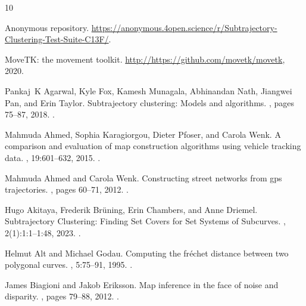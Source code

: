 \documentclass[11pt]{article}
\begin{document}
\begin{thebibliography}{10}

Anonymous repository.
\newblock
  \url{https://anonymous.4open.science/r/Subtrajectory-Clustering-Test-Suite-C13F/}.

{MoveTK: the movement toolkit}.
\newblock \url{http://https://github.com/movetk/movetk}, 2020.

Pankaj~K Agarwal, Kyle Fox, Kamesh Munagala, Abhinandan Nath, Jiangwei Pan, and
  Erin Taylor.
\newblock Subtrajectory clustering: Models and algorithms.
, pages 75--87, 2018.
\newblock \href {https://doi.org/10.1145/3196959.3196972}
  {}.

Mahmuda Ahmed, Sophia Karagiorgou, Dieter Pfoser, and Carola Wenk.
\newblock A comparison and evaluation of map construction algorithms using
  vehicle tracking data.
, 19:601--632, 2015.
\newblock \href {https://doi.org/10.1007/s10707-014-0222-6}
  {}.

Mahmuda Ahmed and Carola Wenk.
\newblock Constructing street networks from gps trajectories.
, pages 60--71, 2012.
\newblock \href {https://doi.org/10.1007/978-3-642-33090-2_7}
  {}.

Hugo Akitaya, Frederik Brüning, Erin Chambers, and Anne Driemel.
\newblock Subtrajectory {Clustering}: {Finding} {Set} {Covers} for {Set}
  {Systems} of {Subcurves}.
, 2(1):1:1--1:48, 2023.
\newblock \href {https://doi.org/10.57717/cgt.v2i1.7}
  {}.

Helmut Alt and Michael Godau.
\newblock Computing the fr{\'e}chet distance between two polygonal curves.
, 5:75--91, 1995.
\newblock \href {https://doi.org/10.1142/S0218195995000064}
  {}.

James Biagioni and Jakob Eriksson.
\newblock Map inference in the face of noise and disparity.
, pages 79--88, 2012.
\newblock \href {https://doi.org/10.1145/2424321.2424333}
  {}.


\end{thebibliography}
\end{document}

